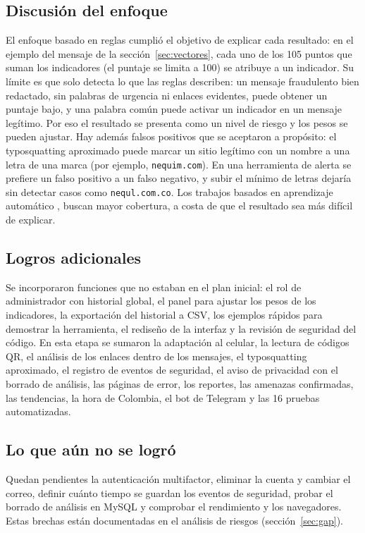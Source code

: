 \documentclass[journal,onecolumn,12pt,draftclsnofoot]{IEEEtran}
\begin{document}
\subsection{Discusión del enfoque}

El enfoque basado en reglas cumplió el objetivo de explicar cada resultado: en el ejemplo del mensaje de la sección~\ref{sec:vectores}, cada uno de los 105 puntos que suman los indicadores (el puntaje se limita a 100) se atribuye a un indicador. Su límite es que solo detecta lo que las reglas describen: un mensaje fraudulento bien redactado, sin palabras de urgencia ni enlaces evidentes, puede obtener un puntaje bajo, y una palabra común puede activar un indicador en un mensaje legítimo. Por eso el resultado se presenta como un nivel de riesgo y los pesos se pueden ajustar. Hay además falsos positivos que se aceptaron a propósito: el typosquatting aproximado puede marcar un sitio legítimo con un nombre a una letra de una marca (por ejemplo, \texttt{nequim.com}). En una herramienta de alerta se prefiere un falso positivo a un falso negativo, y subir el mínimo de letras dejaría sin detectar casos como \texttt{nequl.com.co}. Los trabajos basados en aprendizaje automático \cite{jain}, \cite{jalil} buscan mayor cobertura, a costa de que el resultado sea más difícil de explicar.

\subsection{Logros adicionales}

Se incorporaron funciones que no estaban en el plan inicial: el rol de administrador con historial global, el panel para ajustar los pesos de los indicadores, la exportación del historial a CSV, los ejemplos rápidos para demostrar la herramienta, el rediseño de la interfaz y la revisión de seguridad del código. En esta etapa se sumaron la adaptación al celular, la lectura de códigos QR, el análisis de los enlaces dentro de los mensajes, el typosquatting aproximado, el registro de eventos de seguridad, el aviso de privacidad con el borrado de análisis, las páginas de error, los reportes, las amenazas confirmadas, las tendencias, la hora de Colombia, el bot de Telegram y las 16 pruebas automatizadas.

\subsection{Lo que aún no se logró}

Quedan pendientes la autenticación multifactor, eliminar la cuenta y cambiar el correo, definir cuánto tiempo se guardan los eventos de seguridad, probar el borrado de análisis en MySQL y comprobar el rendimiento y los navegadores. Estas brechas están documentadas en el análisis de riesgos (sección~\ref{sec:gap}).
\end{document}
